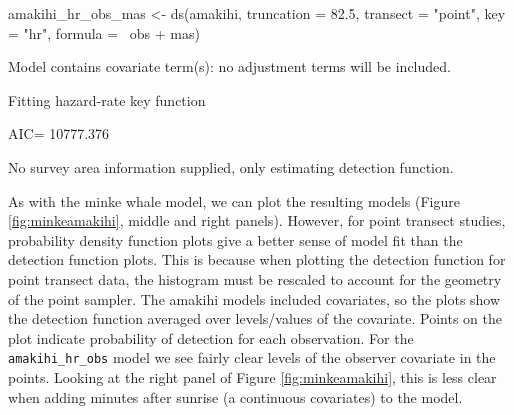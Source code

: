 \documentclass[article,shortnames]{jss}
\begin{document}
\begin{CodeChunk}
\begin{CodeInput}
amakihi_hr_obs_mas <- ds(amakihi, truncation = 82.5, transect = "point",
                         key = "hr", formula = ~obs + mas)
\end{CodeInput}
\begin{CodeOutput}
Model contains covariate term(s): no adjustment terms will be included.
\end{CodeOutput}
\begin{CodeOutput}
Fitting hazard-rate key function
\end{CodeOutput}
\begin{CodeOutput}
AIC= 10777.376
\end{CodeOutput}
\begin{CodeOutput}
No survey area information supplied, only estimating detection function.
\end{CodeOutput}
\end{CodeChunk}

As with the minke whale model, we can plot the resulting models (Figure
\ref{fig:minkeamakihi}, middle and right panels). However, for point
transect studies, probability density function plots give a better sense
of model fit than the detection function plots. This is because when
plotting the detection function for point transect data, the histogram
must be rescaled to account for the geometry of the point sampler. The
amakihi models included covariates, so the plots show the detection
function averaged over levels/values of the covariate. Points on the
plot indicate probability of detection for each observation. For the
\texttt{amakihi\_hr\_obs} model we see fairly clear levels of the
observer covariate in the points. Looking at the right panel of Figure
\ref{fig:minkeamakihi}, this is less clear when adding minutes after
sunrise (a continuous covariates) to the model.
\end{document}

